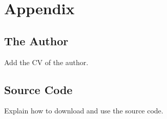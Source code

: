 
\chapter{Appendix}
	\label{chapter:appendix}

	\section{The Author}
		\label{sec:appendix:author}
		Add the CV of the author.


	\clearpage
	\section{Source Code}
		\label{sec:appendix:source}
		Explain how to download and use the source code.


	\let\chapter\section

	\clearpage
	
	

	\clearpage
	\listoffigures
	\listoftables

	\makeatletter
	\section{\listalgorithmcfname}
	\@mkboth{\MakeUppercase\listalgorithmcfname}{\MakeUppercase\listalgorithmcfname}
	\makeatother

	\clearpage

	\makeatletter
	\if@todonotes@disabled%
	\else
		\section{\@todonotes@todolistname}
	\fi
	\makeatother
